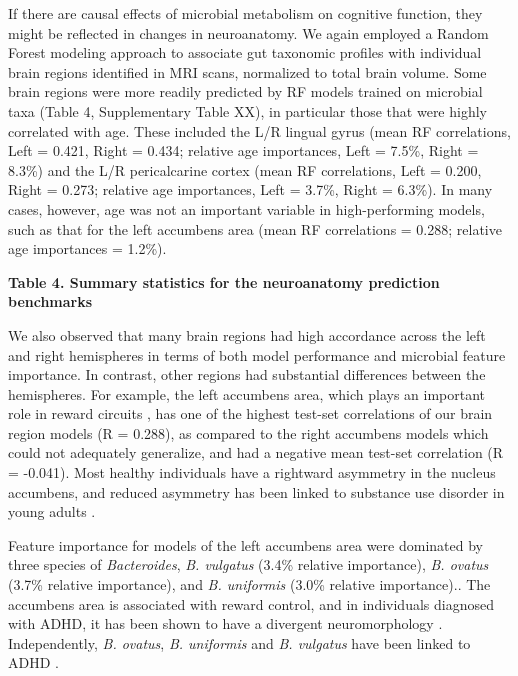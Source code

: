 \documentclass[a4paper]{article}
\begin{document}
If there are causal effects of microbial metabolism on cognitive
function, they might be reflected in changes in neuroanatomy. We again
employed a Random Forest modeling approach to associate gut taxonomic
profiles with individual brain regions identified in MRI scans,
normalized to total brain volume. Some brain regions were more readily
predicted by RF models trained on microbial taxa (Table 4, Supplementary
Table XX), in particular those that were highly correlated with age.
These included the L/R lingual gyrus (mean RF correlations, Left =
0.421, Right = 0.434; relative age importances, Left = 7.5\%, Right =
8.3\%) and the L/R pericalcarine cortex (mean RF correlations, Left =
0.200, Right = 0.273; relative age importances, Left = 3.7\%, Right =
6.3\%). In many cases, however, age was not an important variable in
high-performing models, such as that for the left accumbens area (mean
RF correlations = 0.288; relative age importances = 1.2\%).

\textbf{Table 4. Summary statistics for the neuroanatomy prediction benchmarks}

We also observed that many brain regions had high accordance across the
left and right hemispheres in terms of both model performance and
microbial feature importance. In contrast, other regions had substantial
differences between the hemispheres. For example, the left accumbens
area, which plays an important role in reward circuits
\citep{ernstAmygdalaNucleusAccumbens2005,yauNucleusAccumbensResponse2012},
has one of the highest test-set correlations of our
brain region models (R = 0.288), as compared to the right accumbens
models which could not adequately generalize, and had a negative mean
test-set correlation (R = -0.041). Most healthy individuals have a
rightward asymmetry in the nucleus accumbens, and reduced asymmetry has
been linked to substance use disorder in young adults
\citep{caoMappingCorticalSubcortical2021}.

Feature importance for models of the left accumbens area were dominated
by three species of \emph{Bacteroides}, \emph{B. vulgatus} (3.4\%
relative importance), \emph{B. ovatus} (3.7\% relative importance), and
\emph{B. uniformis} (3.0\% relative importance).. The accumbens area is
associated with reward control, and in individuals diagnosed with ADHD,
it has been shown to have a divergent neuromorphology
\citep{hoogmanSubcorticalBrainVolume2017}.
Independently, \emph{B. ovatus}, \emph{B. uniformis} and
\emph{B. vulgatus} have been linked to ADHD
\citep{wangGutMicrobiotaDietary2020}.
\end{document}
